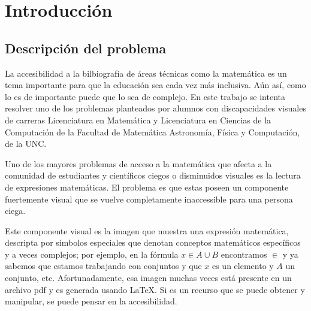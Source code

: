 
\chapter{Introducción} %

\label{Capítulo 1} %


\newcommand{\keyword}[1]{\textbf{#1}}
\newcommand{\tabhead}[1]{\textbf{#1}}
\newcommand{\code}[1]{\texttt{#1}}
\newcommand{\file}[1]{\texttt{\bfseries#1}}
\newcommand{\option}[1]{\texttt{\itshape#1}}

\section{Descripción del problema}

La accesibilidad a la bilbiografía de áreas técnicas como la matemática es un tema importante para que la educación sea cada vez más inclusiva.
Aún así, como lo es de importante puede que lo sea de complejo.
En este trabajo se intenta resolver uno de los problemas planteados por alumnos con discapacidades visuales de carreras Licenciatura en Matemática y Licenciatura en Ciencias de la Computación de la Facultad de Matemática Astronomía, Física y Computación, de la UNC.

Uno de los mayores problemas de acceso a la matemática que afecta a la comunidad de estudiantes y científicos ciegos o disminuidos visuales es la lectura de expresiones matemáticas.
El problema es que estas poseen un componente fuertemente visual que se vuelve completamente inaccessible para una persona ciega. \

Este componente visual es la imagen que muestra una expresión matemática, descripta por símbolos especiales que denotan conceptos matemáticos específicos y a veces complejos; por ejemplo, en la fórmula $x \in A \cup B$ encontramos $\in$ y ya sabemos que estamos trabajando con conjuntos y que $x$ es un elemento y $A$ un conjunto, etc. Afortunadamente, esa imagen muchas veces está presente en un archivo pdf y es generada usando \LaTeX{}. Si es un recurso que se puede obtener y manipular, se puede pensar en la accesibilidad.\

